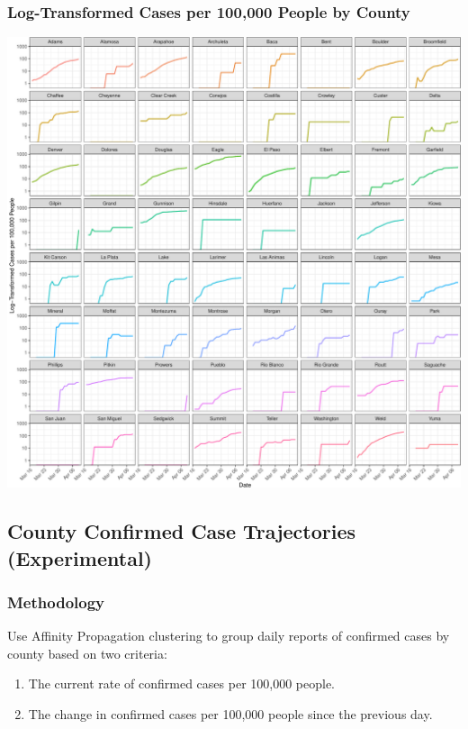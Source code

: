 \documentclass[]{article}
\providecommand{\tightlist}{%
  \setlength{\itemsep}{0pt}\setlength{\parskip}{0pt}}
\begin{document}
\hypertarget{log-transformed-cases-per-100000-people-by-county}{%
\subsubsection{Log-Transformed Cases per 100,000 People by
County}\label{log-transformed-cases-per-100000-people-by-county}}

\includegraphics{figs/daily-cases-100k-log-1.pdf}

\newpage

\hypertarget{county-confirmed-case-trajectories-experimental}{%
\subsection{County Confirmed Case Trajectories
(Experimental)}\label{county-confirmed-case-trajectories-experimental}}

\hypertarget{methodology}{%
\subsubsection{Methodology}\label{methodology}}

Use Affinity Propagation clustering to group daily reports of confirmed
cases by county based on two criteria:

\begin{enumerate}
\def\labelenumi{\arabic{enumi}.}
\tightlist
\item
  The current rate of confirmed cases per 100,000 people.
\item
  The change in confirmed cases per 100,000 people since the previous
  day.
\end{enumerate}
\end{document}
